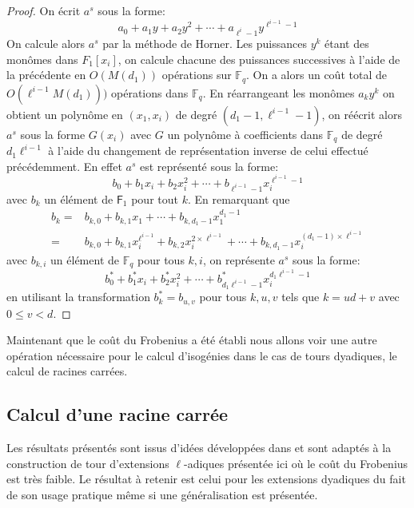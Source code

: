 \documentclass[10pt,a4paper]{book}
\theoremstyle{plain}
\theoremstyle{definition}
\theoremstyle{definition}
\theoremstyle{definition}
\theoremstyle{definition}
\theoremstyle{definition}
\theoremstyle{remark}
\theoremstyle{remark}
\theoremstyle{definition}
\begin{document}
\begin{proof}
On écrit $a^s$ sous la forme:
\begin{equation*}
a_0 + a_1 y + a_2 y^2 + \cdots + a_{\ell^i-1}y^{\ell^{i-1}-1}
\end{equation*}
On calcule alors $a^s$ par la méthode de Horner. Les puissances $y^k$ étant des monômes dans $F_1[x_i]$, on calcule chacune des puissances successives à l'aide de la précédente en $O(M(d_1))$ opérations sur $\mathbb{F}_q$. On a alors un coût total de $O(\ell^{i-1}M(d_1)))$ opérations dans $\mathbb{F}_q$. En réarrangeant les monômes $a_k y^k$ on obtient un polynôme en $(x_1,x_i)$ de degré $(d_1-1,\ell^{i-1}-1)$, on réécrit alors $a^s$ sous la forme $G(x_i)$ avec $G$ un polynôme à coefficients dans $\mathbb{F}_q$ de degré $d_1\ell^{i-1}$  à l'aide du changement de représentation inverse de celui effectué précédemment. En effet $a^s$ est représenté sous la forme:
\begin{equation*}
b_0 + b_1 x_i + b_2 x_i^2 + \cdots + b_{\ell^{i-1}-1}x_i^{\ell^{i-1}-1}
\end{equation*}
avec $b_k$ un élément de $\mathsf{F}_1$ pour tout $k$. En remarquant que
\begin{equation*}
\begin{alignedat}{1}
 b_k= & b_{k,0} + b_{k,1}x_1 + \cdots + b_{k,d_1-1} x_1^{d_1-1} \\
 = & b_{k,0} + b_{k,1}x_i^{\ell^{i-1}} + b_{k,2} x_i^{2 \times \ell^{i-1}} + \cdots + b_{k,d_1-1} x_i^{(d_1-1)\times \ell^{i-1}}
 \end{alignedat} 
\end{equation*}
 avec $b_{k,i}$ un élément de $\mathbb{F}_q$ pour tous $k,i$, on représente $a^s$ sous la forme:
\begin{equation*}
b_0^* + b_1^* x_i + b^*_2 x_i^2 + \cdots + b^*_{d_1\ell^{i-1}-1} x_i^{d_1\ell^{i-1}-1}
\end{equation*}
 en  utilisant la transformation $b_k^*=b_{u,v}$ pour tous $k,u,v$ tels que $k=ud+v$ avec $0 \leqslant v < d$.
\end{proof}

Maintenant que le coût du Frobenius a été établi nous allons voir une autre opération nécessaire pour le calcul d'isogénies dans le cas de tours dyadiques, le calcul de racines carrées.

\subsection*{Calcul d'une racine carrée}
Les résultats présentés sont issus d'idées développées dans \cite{Doliskani-Schost14} et sont adaptés à la construction de tour d'extensions $\ell$-adiques présentée ici où le coût du Frobenius est très faible. Le résultat à retenir est celui pour les extensions dyadiques du fait de son usage pratique même si une généralisation est présentée. 
\end{document}
